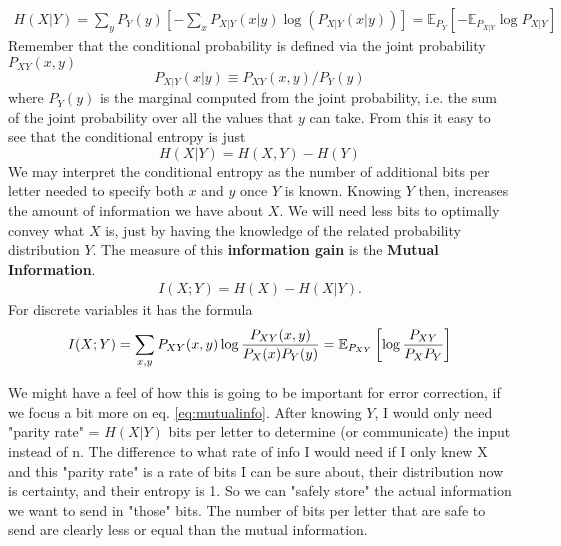 \begin{eqnarray}
H(X|Y)=\sum_y P_Y(y) \left[ - \sum_x P_{X|Y}(x|y) \log
\left(P_{X|Y}(x|y)\right)\right]
= \mathbb{E}_{P_Y} \left[ - \mathbb{E}_{P_{X|Y}} \log P_{X|Y} \right]
\end{eqnarray}
Remember that the conditional probability is defined via the joint probability $P_{XY}(x,y)$
\begin{equation}\label{conditional_entropy}
	P_{X|Y}(x|y) \equiv P_{XY}(x,y)/P_Y(y)
\end{equation}
where $P_Y(y)$ is the marginal computed from the joint probability, i.e. the sum of the joint probability over all the values that $y$ can take.
From this it easy to see that the conditional entropy is just
\begin{equation}
H(X|Y) = H(X,Y) - H(Y)
\end{equation}
We may interpret the conditional entropy as the number of additional bits per letter needed to specify both $x$ and $y$ once $Y$ is known.
Knowing $Y$ then, increases the amount of information we have about $X$. We will need less bits to optimally convey what $X$ is, just by having the knowledge of the related probability distribution $Y$. The measure of this \textbf{information gain} is the \textbf{Mutual Information}.
\begin{eqnarray}
	I(X;Y)=H(X)-H(X|Y).
\end{eqnarray} \label{eq:mutualinfo}
For discrete variables it has the formula
\begin{equation}
	I(X;Y) = \sum_{x,y} P_{XY}(x,y) \log
	{P_{XY}(x,y) \over P_X(x) P_Y(y)}
	= \mathbb{E}_{P_{XY}} \left[\log{P_{XY} \over P_X P_Y}\right]
\end{equation}

\begin{info}
	We might have a feel of how this is going to be important for error correction, if we focus a bit more on eq. \ref{eq:mutualinfo}. After knowing $Y$, I would only need "parity rate" = $H(X|Y)$ bits per letter to determine (or communicate) the input instead of n. The difference to what rate of info I would need if I only knew X and this "parity rate" is a rate of bits I can be sure about, their distribution now is certainty, and their entropy is 1. So we can "safely store" the actual information we want to send in "those" bits. The number of bits per letter that are safe to send are clearly less or equal than the mutual information.  
\end{info}
 
